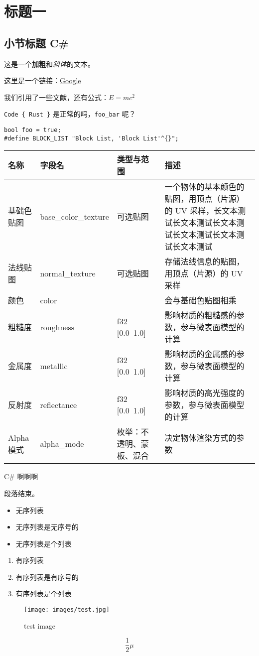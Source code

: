 \chapter*{标题一}

\section{小节标题 C\#}

这是一个\textbf{加粗}和\textit{斜体}的文本。

这里是一个链接：\href{https://www.google.com}{Google}

我们引用了一些文献\cite{foo}，还有公式：$E = mc^2$

\texttt{Code \{ Rust \}} 是正常的吗，\texttt{foo\_bar} 呢？

\begin{lstlisting}
bool foo = true;
#define BLOCK_LIST "Block List, 'Block List'^{}";
\end{lstlisting}


\begin{tabularx}{\textwidth}{|>{\centering\arraybackslash}X|>{\centering\arraybackslash}X|>{\centering\arraybackslash}X|>{\centering\arraybackslash}X|} \hline
名称 & 字段名 & 类型与范围 & 描述 \\ \hline
基础色贴图 & base\_color\_texture & 可选贴图 & 一个物体的基本颜色的贴图，用顶点（片源）的 UV 采样，长文本测试长文本测试长文本测试长文本测试长文本测试长文本测试 \\ \hline
法线贴图 & normal\_texture & 可选贴图 & 存储法线信息的贴图，用顶点（片源）的 UV 采样 \\ \hline
颜色 & color & [f32; 4] & 会与基础色贴图相乘 \\ \hline
粗糙度 & roughness & f32 [0.0~1.0] & 影响材质的粗糙感的参数，参与微表面模型的计算 \\ \hline
金属度 & metallic & f32 [0.0~1.0] & 影响材质的金属感的参数，参与微表面模型的计算 \\ \hline
反射度 & reflectance & f32 [0.0~1.0] & 影响材质的高光强度的参数，参与微表面模型的计算 \\ \hline
Alpha 模式 & alpha\_mode & 枚举：不透明、蒙板、混合 & 决定物体渲染方式的参数 \\ \hline
\end{tabularx}

C\# 啊啊啊

段落结束。

\begin{itemize}
\item 无序列表
\item 无序列表是无序号的
\item 无序列表是个列表
\end{itemize}
\begin{enumerate}
\item 有序列表
\item 有序列表是有序号的
\item 有序列表是个列表
\end{enumerate}
\begin{figure}[h]
\centering
\texttt{[image: images/test.jpg]}
\caption{test image}
\label{fig:images/test.jpg}
\end{figure}


\begin{equation}
\frac{1}{2}\mu
\end{equation}

